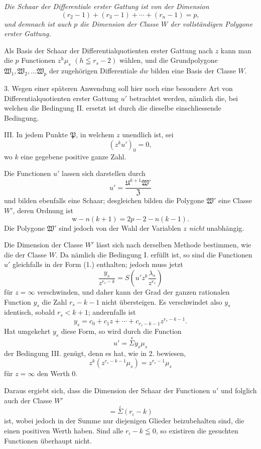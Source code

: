 \documentclass{article}
\begin{document}
\emph{Die Schaar der Differentiale erster Gattung ist von der Dimension}
\[ (r_{2}-1) + (r_{3}-1) + \cdots + (r_{n}-1) = p, \]
\emph{und demnach ist auch $p$ die Dimension der Classe $W$ der vollständigen Polygone erster Gattung.}

Als Basis der Schaar der Differentialquotienten erster Gattung nach $z$ kann man die $p$ Functionen $z^{h}\mu_{s}$ $(h \leqq r_{s}-2)$ wählen, und die Grundpolygone $\mathfrak{W}_{1}, \mathfrak{W}_{2}, \ldots \mathfrak{W}_{p}$ der zugehörigen Differentiale $dw$ bilden eine Basis der Classe $W$.

3. Wegen einer späteren Anwendung soll hier noch eine besondere Art von Differentialquotienten erster Gattung $u'$ betrachtet werden, nämlich die, bei welchen die Bedingung II. ersetzt ist durch die dieselbe einschliessende Bedingung.

III. In jedem Punkte $\mathfrak{P}$, in welchem $z$ unendlich ist, sei
\[ (z^{k}u')_{0} = 0, \]
wo $k$ eine gegebene positive ganze Zahl.

Die Functionen $u'$ lassen sich darstellen durch
\[ u' = \frac{\mathfrak{U}^{k+1}\mathfrak{W}'}{\mathfrak{Z}} \]
und bilden ebenfalls eine Schaar; desgleichen bilden die Polygone $\mathfrak{W}'$ eine Classe $W'$, deren Ordnung ist
\[ \mathrm{w}-n(k+1) = 2p-2-n(k-1). \]
Die Polygone $\mathfrak{W}'$ sind jedoch von der Wahl der Variablen $z$ \emph{nicht} unabhängig.

Die Dimension der Classe $W'$ lässt sich nach derselben Methode bestimmen, wie die der Classe $W$. Da nämlich die Bedingung I. erfüllt ist, so sind die Functionen $u'$ gleichfalls in der Form (1.) enthalten; jedoch muss jetzt
\[ \frac{y_{s}}{z^{r_{s}-k}} = S\left(u'z^{k}\frac{\lambda_{s}}{z^{r_{s}}}\right) \]
für $z = \infty$ verschwinden, und daher kann der Grad der ganzen rationalen Function $y_{s}$ die Zahl $r_{s}-k-1$ nicht übersteigen. Es verschwindet also $y_{s}$ identisch, sobald $r_{s} < k+1$; andernfalls ist
\[ y_{s} = c_{0} + c_{1}z + \cdots + c_{r_{s}-k-1}z^{r_{s}-k-1}. \tag{3.} \]
Hat umgekehrt $y_{s}$ diese Form, so wird durch die Function
\[ u' = \overset{s}{\Sigma} y_{s}\mu_{s} \]
der Bedingung III. genügt, denn es hat, wie in 2. bewiesen,
\[ z^{k}(z^{r_{s}-k-1}\mu_{s}) = z^{r_{s}-1}\mu_{s} \]
für $z = \infty$ den Werth 0.

Daraus ergiebt sich, dass die Dimension der Schaar der Functionen $u'$ und folglich auch der Classe $W'$
\[ = \overset{\iota}{\Sigma}(r_{\iota}-k) \]
ist, wobei jedoch in der Summe nur diejenigen Glieder beizubehalten sind, die einen positiven Werth haben. Sind alle $r_{\iota}-k \leqq 0$, so existiren die gesuchten Functionen überhaupt nicht.
\end{document}
